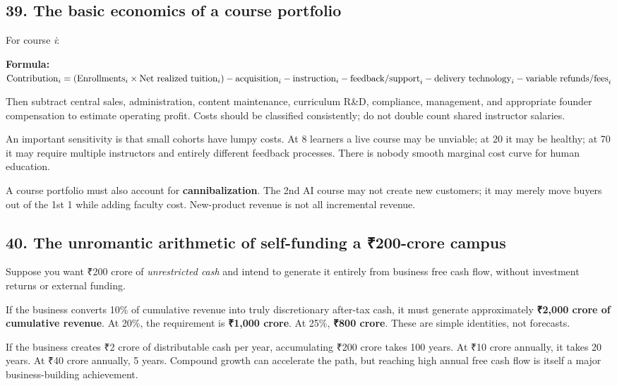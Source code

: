 \subsection{39. The basic economics of a course portfolio}

For course \textit{i}:

\par\smallskip\noindent\textbf{Formula:} $\text{Contribution}_i = (\text{Enrollments}_i \times \text{Net realized tuition}_i) - \text{acquisition}_i - \text{instruction}_i - \text{feedback/\allowbreak support}_i - \text{delivery technology}_i - \text{variable refunds/\allowbreak fees}_i$\par\smallskip

Then subtract central sales, administration, content maintenance, curriculum R\&D, compliance, management, and appropriate founder compensation to estimate operating profit. Costs should be classified consistently; do not double count shared instructor salaries.

An important sensitivity is that small cohorts have lumpy costs. At 8 learners a live course may be unviable; at 20 it may be healthy; at 70 it may require multiple instructors and entirely different feedback processes. There is nobody smooth marginal cost curve for human education.

A course portfolio must also account for \textbf{cannibalization}. The 2nd AI course may not create new customers; it may merely move buyers out of the 1st 1 while adding faculty cost. New-product revenue is not all incremental revenue.

\subsection{40. The unromantic arithmetic of self-funding a \textnormal{₹}200-crore campus}

Suppose you want \textnormal{₹}200 crore of \textit{unrestricted cash} and intend to generate it entirely from business free cash flow, without investment returns or external funding.

If the business converts 10\% of cumulative revenue into truly discretionary after-tax cash, it must generate approximately \textbf{\textnormal{₹}2,000 crore of cumulative revenue}. At 20\%, the requirement is \textbf{\textnormal{₹}1,000 crore}. At 25\%, \textbf{\textnormal{₹}800 crore}. These are simple identities, not forecasts.

If the business creates \textnormal{₹}2 crore of distributable cash per year, accumulating \textnormal{₹}200 crore takes 100 years. At \textnormal{₹}10 crore annually, it takes 20 years. At \textnormal{₹}40 crore annually, 5 years. Compound growth can accelerate the path, but reaching high annual free cash flow is itself a major business-building achievement.

